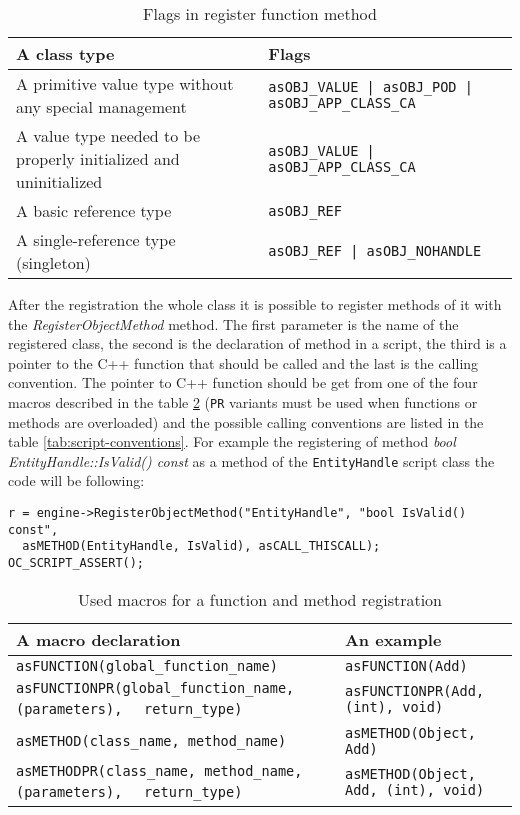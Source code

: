 \begin{table}[htbp]
	\centering
		{\scriptsize
		\begin{tabular}{|p{0.43\hsize}|p{0.50\hsize}|}
		\hline
		A class type & Flags\\
		\hline
		A primitive value type without any special management & \verb/asOBJ_VALUE | asOBJ_POD | asOBJ_APP_CLASS_CA/\\
		A value type needed to be properly initialized and uninitialized & \verb/asOBJ_VALUE | asOBJ_APP_CLASS_CA/\\
		A basic reference type & \verb/asOBJ_REF/\\
		A single-reference type (singleton) & \verb/asOBJ_REF | asOBJ_NOHANDLE/\\
		\hline
		\end{tabular}
		}
	\caption{Flags in register function method}
	\label{tab:script-objecttype}
\end{table}

After the registration the whole class it is possible to register methods of it with the \emph{RegisterObjectMethod} method. The first parameter is the name of the registered class, the second is the declaration of method in a script, the third is a pointer to the C++ function that should be called and the last is the calling convention. The pointer to C++ function should be get from one of the four macros described in the table \ref{tab:script-macros} (\verb/PR/ variants must be used when functions or methods are overloaded) and the possible calling conventions are listed in the table \ref{tab:script-conventions}. For example the registering of method \emph{bool EntityHandle::IsValid() const} as a method of the \verb/EntityHandle/ script class the code will be following:

{\footnotesize\begin{verbatim}
r = engine->RegisterObjectMethod("EntityHandle", "bool IsValid() const",
  asMETHOD(EntityHandle, IsValid), asCALL_THISCALL); OC_SCRIPT_ASSERT();
\end{verbatim}}

\begin{table}[htbp]
	\centering
		{\scriptsize
		\begin{tabular}{|p{0.55\hsize}|p{0.38\hsize}|}
		\hline
		A macro declaration & An example\\
		\hline
		\verb/asFUNCTION(global_function_name)/ & \verb/asFUNCTION(Add)/\\
		\verb/asFUNCTIONPR(global_function_name, (parameters),/ \verb/  return_type)/ & \verb/asFUNCTIONPR(Add, (int), void)/\\
		\verb/asMETHOD(class_name, method_name)/ & \verb/asMETHOD(Object, Add)/\\
		\verb/asMETHODPR(class_name, method_name, (parameters),/ \verb/  return_type)/ & \verb/asMETHOD(Object, Add, (int), void)/\\
		\hline
		\end{tabular}
		}
	\caption{Used macros for a function and method registration}
	\label{tab:script-macros}
\end{table}

